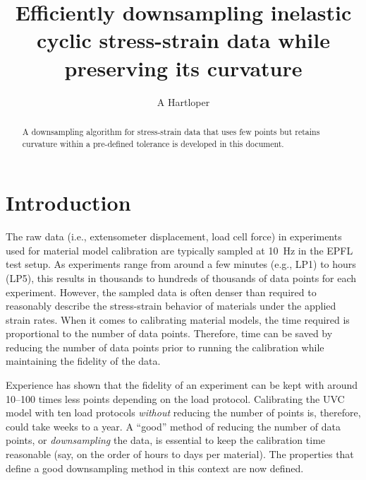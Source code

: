 \documentclass[a4paper,11pt]{article}
\title{Efficiently downsampling inelastic cyclic stress-strain data while preserving its curvature}
\author{A Hartloper}
\begin{document}
\maketitle

\begin{abstract}
    A downsampling algorithm for stress-strain data that uses few points but retains curvature within a pre-defined tolerance is developed in this document.
\end{abstract}

\section{Introduction}

The raw data (i.e., extensometer displacement, load cell force) in experiments used for material model calibration are typically sampled at 10~Hz in the EPFL test setup.
As experiments range from around a few minutes (e.g., LP1) to hours (LP5), this results in thousands to hundreds of thousands of data points for each experiment.
However, the sampled data is often denser than required to reasonably describe the stress-strain behavior of materials under the applied strain rates.
When it comes to calibrating material models, the time required is proportional to the number of data points.
Therefore, time can be saved by reducing the number of data points prior to running the calibration while maintaining the fidelity of the data.

Experience has shown that the fidelity of an experiment can be kept with around 10--100 times less points depending on the load protocol.
Calibrating the UVC model with ten load protocols \emph{without} reducing the number of points is, therefore, could take weeks to a year.
A ``good'' method of reducing the number of data points, or \emph{downsampling} the data, is essential to keep the calibration time reasonable (say, on the order of hours to days per material).
The properties that define a good downsampling method in this context are now defined.
\end{document}
